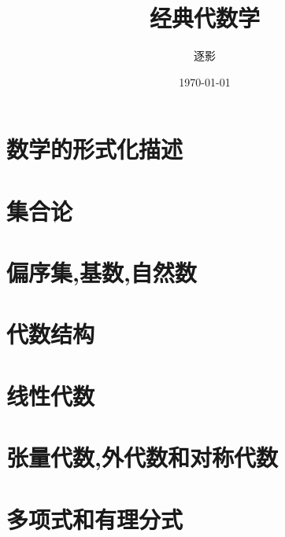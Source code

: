 \documentclass[UTF8,10pt, a4paper, oneside,scheme=plain]{ctexbook}
\author{逐影}
\title{\Huge\textbf{经典代数学}}
\date{\today}
\begin{document}
\frontmatter
\maketitle
\tableofcontents
\mainmatter

\part{数学的形式化描述}



\part{集合论}



\part{偏序集,基数,自然数}



\part{代数结构}



\part{线性代数}



\part{张量代数,外代数和对称代数}



\part{多项式和有理分式}



\end{document}
